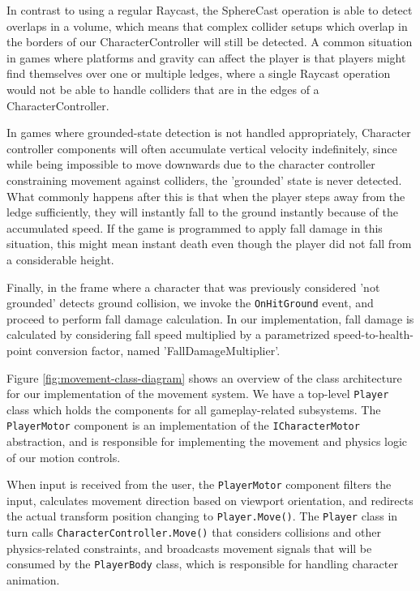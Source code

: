 In contrast to using a regular Raycast, the SphereCast operation is able to detect overlaps in a volume, which means that complex collider setups which overlap in the borders of our CharacterController will still be detected. A common situation in games where platforms and gravity can affect the player is that players might find themselves over one or multiple ledges, where a single Raycast operation would not be able to handle colliders that are in the edges of a CharacterController.


In games where grounded-state detection is not handled appropriately, Character controller components will often accumulate vertical velocity indefinitely, since while being impossible to move downwards due to the character controller constraining movement against colliders, the 'grounded' state is never detected. What commonly happens after this is that when the player steps away from the ledge sufficiently, they will instantly fall to the ground instantly because of the accumulated speed. If the game is programmed to apply fall damage in this situation, this might mean instant death even though the player did not fall from a considerable height.

Finally, in the frame where a character that was previously considered 'not grounded' detects ground collision, we invoke the \texttt{OnHitGround} event, and proceed to perform fall damage calculation. In our implementation, fall damage is calculated by considering fall speed multiplied by a parametrized speed-to-health-point conversion factor, named 'FallDamageMultiplier'.

Figure \ref{fig:movement-class-diagram} shows an overview of the class architecture for our implementation of the movement system. We have a top-level \texttt{Player} class which holds the components for all gameplay-related subsystems. The \texttt{PlayerMotor} component is an implementation of the \texttt{ICharacterMotor} abstraction, and is responsible for implementing the movement and physics logic of our motion controls.

When input is received from the user, the \texttt{PlayerMotor} component filters the input, calculates movement direction based on viewport orientation, and redirects the actual transform position changing to \texttt{Player.Move()}. The \texttt{Player} class in turn calls \texttt{CharacterController.Move()} that considers collisions and other physics-related constraints, and broadcasts movement signals that will be consumed by the \texttt{PlayerBody} class, which is responsible for handling character animation.


